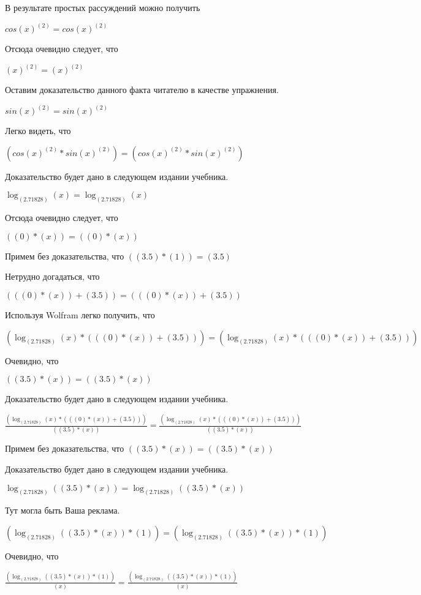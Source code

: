 \documentclass[12pt,a4paper,fleqn]{article}
\theoremstyle{definition}
\begin{document}
В результате простых рассуждений можно получить

$cos{( x )}^{( 2 )} = cos{( x )}^{( 2 )}$

Отсюда очевидно следует, что

${( x )}^{( 2 )} = {( x )}^{( 2 )}$

Оставим доказательство данного факта читателю в качестве упражнения.

$sin{( x )}^{( 2 )} = sin{( x )}^{( 2 )}$

Легко видеть, что

$(cos{( x )}^{( 2 )} * sin{( x )}^{( 2 )}) = (cos{( x )}^{( 2 )} * sin{( x )}^{( 2 )})$

Доказательство будет дано в следующем издании учебника.

$\log_{( 2.71828 )}{( x )} = \log_{( 2.71828 )}{( x )}$

Отсюда очевидно следует, что

$(( 0 ) * ( x )) = (( 0 ) * ( x ))$

Примем без доказательства, что
$(( 3.5 ) * ( 1 )) = ( 3.5 )$

Нетрудно догадаться, что

$((( 0 ) * ( x )) + ( 3.5 )) = ((( 0 ) * ( x )) + ( 3.5 ))$

Используя Wolfram легко получить, что

$(\log_{( 2.71828 )}{( x )} * ((( 0 ) * ( x )) + ( 3.5 ))) = (\log_{( 2.71828 )}{( x )} * ((( 0 ) * ( x )) + ( 3.5 )))$

Очевидно, что

$(( 3.5 ) * ( x )) = (( 3.5 ) * ( x ))$

Доказательство будет дано в следующем издании учебника.

$\frac{(\log_{( 2.71828 )}{( x )} * ((( 0 ) * ( x )) + ( 3.5 )))}{(( 3.5 ) * ( x ))}
 = \frac{(\log_{( 2.71828 )}{( x )} * ((( 0 ) * ( x )) + ( 3.5 )))}{(( 3.5 ) * ( x ))}
$

Примем без доказательства, что
$(( 3.5 ) * ( x )) = (( 3.5 ) * ( x ))$

Доказательство будет дано в следующем издании учебника.

$\log_{( 2.71828 )}{(( 3.5 ) * ( x ))} = \log_{( 2.71828 )}{(( 3.5 ) * ( x ))}$

Тут могла быть Ваша реклама.

$(\log_{( 2.71828 )}{(( 3.5 ) * ( x ))} * ( 1 )) = (\log_{( 2.71828 )}{(( 3.5 ) * ( x ))} * ( 1 ))$

Очевидно, что

$\frac{(\log_{( 2.71828 )}{(( 3.5 ) * ( x ))} * ( 1 ))}{( x )}
 = \frac{(\log_{( 2.71828 )}{(( 3.5 ) * ( x ))} * ( 1 ))}{( x )}
$
\end{document}
